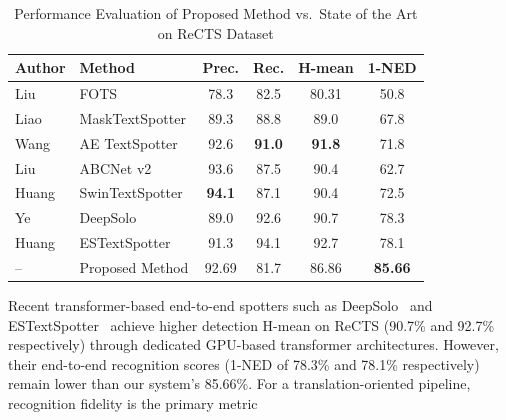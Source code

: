 \documentclass{ieeeaccess}
\begin{document}
{\begin{table}[htbp]
\caption{Performance Evaluation of Proposed Method vs.\ State of the Art on ReCTS Dataset}
\label{tab:rects_compare}
\renewcommand{\arraystretch}{1.1}
\begin{center}
\scriptsize
\begin{tabular}{|>{\raggedright\arraybackslash}p{1.0cm}|>{\raggedright\arraybackslash}p{1.6cm}|c|c|c|c|}
\hline
\textbf{Author} & \textbf{Method} & \textbf{Prec.} & \textbf{Rec.} & \textbf{H-mean} & \textbf{1-NED} \\
\hline
Liu~\cite{b42}   & FOTS             & 78.3  & 82.5          & 80.31          & 50.8 \\
Liao~\cite{b43}  & MaskTextSpotter  & 89.3  & 88.8          & 89.0           & 67.8 \\
Wang~\cite{b44}  & AE TextSpotter   & 92.6  & \textbf{91.0} & \textbf{91.8}  & 71.8 \\
Liu~\cite{b45}   & ABCNet v2        & 93.6  & 87.5          & 90.4           & 62.7 \\
Huang~\cite{b46} & SwinTextSpotter  & \textbf{94.1} & 87.1 & 90.4  & 72.5 \\
\hline
Ye~\cite{b47}    & DeepSolo         & 89.0  & 92.6  & 90.7  & 78.3 \\
\hline
Huang~\cite{b48} & ESTextSpotter    & 91.3  & 94.1  & 92.7  & 78.1 \\
\hline
-- & Proposed Method & 92.69 & 81.7 & 86.86 & \textbf{85.66} \\
\hline
\end{tabular}
\end{center}
\end{table}

Recent transformer-based end-to-end spotters such as DeepSolo~\cite{b47} and ESTextSpotter~\cite{b48} achieve higher detection H-mean on ReCTS (90.7\% and 92.7\% respectively) through dedicated GPU-based transformer architectures. However, their end-to-end recognition scores (1-NED of 78.3\% and 78.1\% respectively) remain lower than our system's 85.66\%. For a translation-oriented pipeline, recognition fidelity is the primary metric 

}
\end{document}
